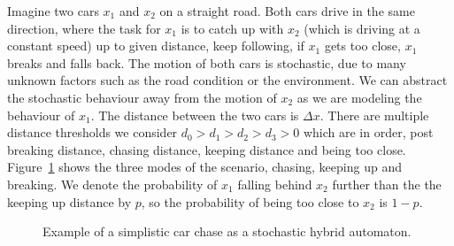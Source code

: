 \begin{ex}
Imagine two cars $x_{1}$ and $x_{2}$ on a straight road. Both cars drive in the same direction, where the task for $x_{1}$ is to catch up with $x_{2}$ (which is driving at a constant speed) up to given distance, keep following, if $x_{1}$ gets too close, $x_{1}$ breaks and falls back. The motion of both cars is stochastic, due to many unknown factors such as the road condition or the environment. We can abstract the stochastic behaviour away from the motion of $x_{2}$ as we are modeling the behaviour of $x_{1}$. The distance between the two cars is $\Delta x$. There are multiple distance thresholds we consider $d_{0}>d_{1}>d_{2}>d_{3}>0$ which are in order, post breaking distance, chasing distance, keeping distance and being too close. Figure~\ref{fig:excar} shows the three modes of the scenario, chasing, keeping up and breaking. We denote the probability of $x_{1}$ falling behind $x_{2}$ further than the the keeping up distance by $p$, so the probability of being too close to $x_{2}$ is $1-p$.
\begin{figure}[H]
    \begin{center}
        \caption{Example of a simplistic car chase as a stochastic hybrid automaton.}
        \label{fig:excar}
    \end{center}
\end{figure}
\end{ex}

